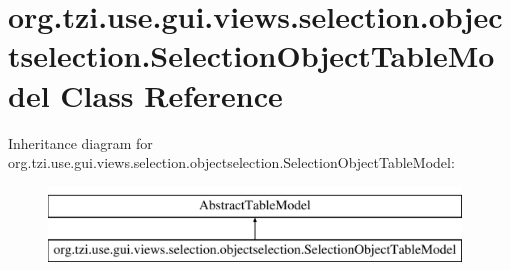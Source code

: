 \hypertarget{classorg_1_1tzi_1_1use_1_1gui_1_1views_1_1selection_1_1objectselection_1_1_selection_object_table_model}{\section{org.\-tzi.\-use.\-gui.\-views.\-selection.\-objectselection.\-Selection\-Object\-Table\-Model Class Reference}
\label{classorg_1_1tzi_1_1use_1_1gui_1_1views_1_1selection_1_1objectselection_1_1_selection_object_table_model}
}
Inheritance diagram for org.\-tzi.\-use.\-gui.\-views.\-selection.\-objectselection.\-Selection\-Object\-Table\-Model\-:\begin{figure}[H]
\begin{center}
\leavevmode
\includegraphics[height=2.000000cm]{classorg_1_1tzi_1_1use_1_1gui_1_1views_1_1selection_1_1objectselection_1_1_selection_object_table_model}
\end{center}
\end{figure}

